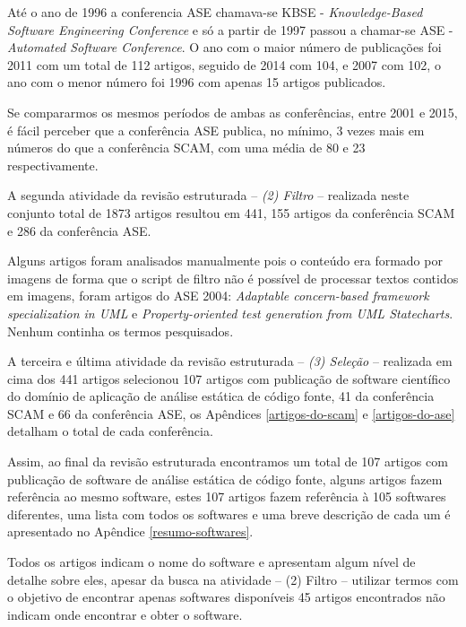Até o ano de 1996 a conferencia ASE chamava-se KBSE - {\it Knowledge-Based
Software Engineering Conference} e só a partir de 1997 passou a chamar-se ASE -
{\it Automated Software Conference}. O ano com o maior número de publicações
foi 2011 com um total de 112 artigos, seguido de 2014 com 104, e 2007 com 102,
o ano com o menor número foi 1996 com apenas 15 artigos publicados.

Se compararmos os mesmos períodos de ambas as conferências, entre 2001 e 2015,
é fácil perceber que a conferência ASE publica, no mínimo, 3 vezes mais em
números do que a conferência SCAM, com uma média de 80 e 23 respectivamente.

A segunda atividade da revisão estruturada -- {\it (2) Filtro} -- realizada
neste conjunto total de 1873 artigos resultou em 441, 155 artigos da
conferência SCAM e 286 da conferência ASE.


Alguns artigos foram analisados manualmente pois o conteúdo era formado por
imagens de forma que o script de filtro não é possível de processar textos
contidos em imagens, foram artigos do ASE 2004: {\it Adaptable concern-based
framework specialization in UML} e {\it Property-oriented test generation from
UML Statecharts}. Nenhum continha os termos pesquisados.

A terceira e última atividade da revisão estruturada -- {\it (3) Seleção} --
realizada em cima dos 441 artigos selecionou 107 artigos com publicação de
software científico do domínio de aplicação de análise estática de código
fonte, 41 da conferência SCAM e 66 da conferência ASE, os Apêndices
\ref{artigos-do-scam} e \ref{artigos-do-ase} detalham o total de cada
conferência.

Assim, ao final da revisão estruturada encontramos um total de 107 artigos com
publicação de software de análise estática de código fonte, alguns artigos
fazem referência ao mesmo software, estes 107 artigos fazem referência à 105
softwares diferentes, uma lista com todos os softwares e uma breve descrição de
cada um é apresentado no Apêndice \ref{resumo-softwares}.

Todos os artigos indicam o nome do software e apresentam algum nível de detalhe
sobre eles, apesar da busca na atividade -- (2) Filtro -- utilizar termos com o
objetivo de encontrar apenas softwares disponíveis 45 artigos encontrados não
indicam onde encontrar e obter o software.

